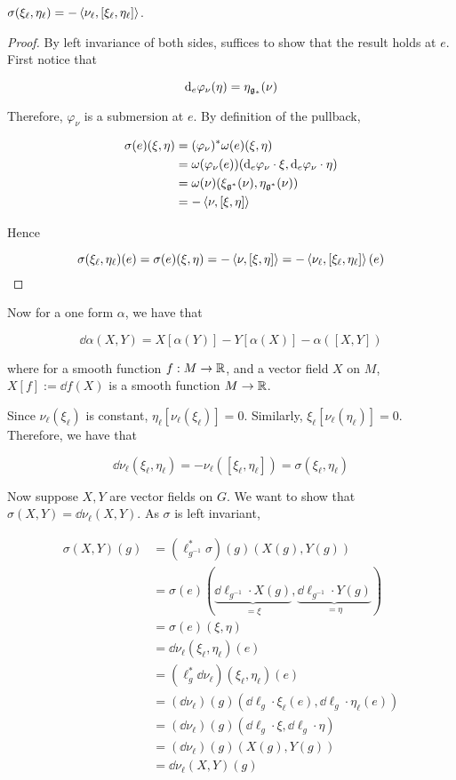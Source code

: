 \documentclass{article}
\begin{document}
\begin{lemma}
    \(\sigma(\xi_\ell, \eta_\ell) = -\left\langle \nu_\ell, [\xi_\ell, \eta_\ell] \right\rangle\).
\end{lemma}

\begin{proof}
    By left invariance of both sides, suffices to show that the result holds at \(e\). First notice that

    \[\dd_e\varphi_\nu(\eta) = \eta_{\mathfrak{g}_*}(\nu)\]

    Therefore, \(\varphi_\nu\) is a submersion at \(e\). By definition of the pullback,

    \begin{align*}
        \sigma(e)(\xi, \eta) &= (\varphi_\nu)^*\omega(e)(\xi, \eta)\\ 
        &= \omega(\varphi_\nu(e))(\dd_e\varphi_\nu \cdot \xi, \dd_e\varphi_\nu\cdot\eta) \\
        &= \omega(\nu)(\xi_{\mathfrak{g}^*}(\nu), \eta_{\mathfrak{g}^*}(\nu)) \\
        &= -\left\langle \nu, [\xi, \eta] \right\rangle
    \end{align*}

    Hence

    \[\sigma(\xi_\ell, \eta_\ell)(e) = \sigma(e)(\xi, \eta) = -\left\langle \nu, [\xi, \eta] \right\rangle = -\left\langle \nu_\ell, [\xi_\ell, \eta_\ell] \right\rangle(e)\]
\end{proof}

Now for a one form \(\alpha\), we have that

\[\dd\alpha(X, Y) = X[\alpha(Y)] - Y[\alpha(X)] - \alpha([X, Y])\]

where for a smooth function \(f : M \to \mathbb{R}\), and a vector field \(X\) on \(M\), \(X[f] := \dd f(X)\) is a smooth function \(M \to \mathbb{R}\).

Since \(\nu_\ell(\xi_\ell)\) is constant, \(\eta_\ell[\nu_\ell(\xi_\ell)] = 0\). Similarly, \(\xi_\ell[\nu_\ell(\eta_\ell)] = 0\). Therefore, we have that

\[\dd \nu_\ell(\xi_\ell, \eta_\ell) = -\nu_\ell([\xi_\ell, \eta_\ell]) = \sigma(\xi_\ell, \eta_\ell)\]

Now suppose \(X, Y\) are vector fields on \(G\). We want to show that \(\sigma(X, Y) = \dd\nu_\ell(X, Y)\). As \(\sigma\) is left invariant,

\begin{align*}
    \sigma(X, Y)(g) &= (\ell_{g^{-1}}^* \sigma)(g)(X(g), Y(g)) \\
    &= \sigma(e)(\underbrace{\dd \ell_{g^{-1}} \cdot X(g)}_{=\xi}, \underbrace{\dd \ell_{g^{-1}} \cdot Y(g)}_{=\eta}) \\
    &= \sigma(e)(\xi, \eta) \\
    &= \dd\nu_\ell(\xi_\ell, \eta_\ell)(e) \\
    &= (\ell_g^*\dd\nu_\ell)(\xi_\ell, \eta_\ell)(e) \\
    &= (\dd\nu_\ell)(g)(\dd\ell_g\cdot \xi_\ell(e), \dd\ell_g\cdot\eta_\ell(e)) \\
    &= (\dd\nu_\ell)(g)(\dd \ell_g\cdot \xi, \dd\ell_g\cdot \eta) \\
    &= (\dd\nu_\ell)(g)(X(g), Y(g)) \\
    &= \dd\nu_\ell(X, Y)(g)
\end{align*}
\end{document}
